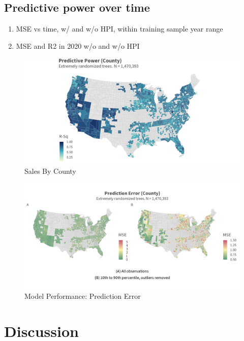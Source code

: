 \documentclass[12pt]{article}
\begin{document}
 
  
\subsection{Predictive power over time}

\begin{enumerate}
    \item MSE vs time, w/ and w/o HPI, within training sample year range
    \item MSE and R2 in 2020 w/o and w/o HPI 
\end{enumerate}

 
 
\begin{figure}
    \centering
    \includegraphics[width=6in]{figures/rf_rsq_map.png}
    \caption{Sales By County}
    \label{fig:rsq_county}
\end{figure}

\begin{figure}
    \centering
    \includegraphics[width=6in]{figures/rf_mse_map.png}
    \caption{Model Performance: Prediction Error}
    \label{fig:mse_county}
\end{figure}


\section{Discussion}
\end{document}
